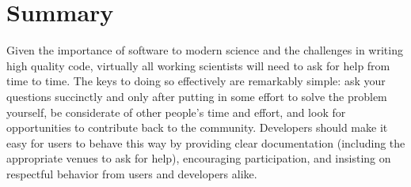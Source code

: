 \documentclass[9pt,training,pubversion]{livecoms}
\begin{document}
\section{Summary}

Given the importance of software to modern science and the challenges in writing
high quality code, virtually all working scientists will need to ask for help
from time to time. The keys to doing so effectively are remarkably simple: ask
your questions succinctly and only after putting in some effort to solve the
problem yourself, be considerate of other people's time and effort, and look for
opportunities to contribute back to the community. Developers should make it
easy for users to behave this way by providing clear documentation (including
the appropriate venues to ask for help), encouraging participation, and
insisting on respectful behavior from users and developers alike.
\end{document}
